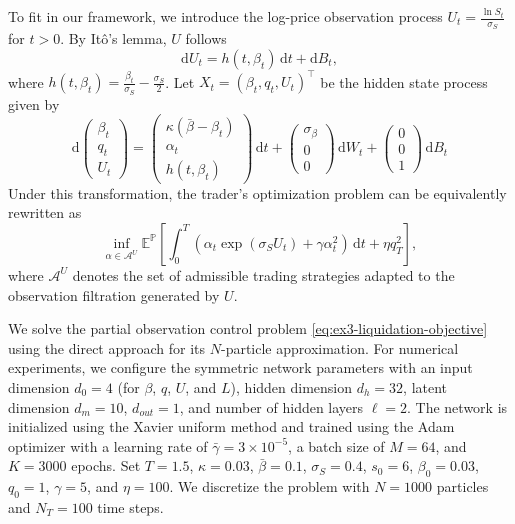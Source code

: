 \documentclass[11pt]{article}
\numberwithin{equation}{section}
\theoremstyle{plain}
\theoremstyle{definition}
\theoremstyle{remark}
\newcommand{\dd}{\mathrm{d}}
\begin{document}
	To fit in our framework, we introduce the log-price observation process $U_t = \frac{\ln S_t}{\sigma_S}$ for $t>0$. By It\^{o}'s lemma, $U$ follows 
	\begin{equation*}
		\dd U_t = h(t, \beta_t)\,\dd t + \dd B_t, 
	\end{equation*}
	where $h(t, \beta_t) = \frac{\beta_t}{\sigma_S} - \frac{\sigma_S}{2}$. 
	Let $X_t = (\beta_t, q_t, U_t)^\top$ be the hidden state process given by 
	\begin{equation*}
		\dd\begin{pmatrix}
			\beta_t \\
			q_t \\
			U_t
		\end{pmatrix} = \begin{pmatrix}
			\kappa(\bar{\beta} - \beta_t) \\
			\alpha_t \\
			h(t,\beta_t)
		\end{pmatrix} \,\dd t + \begin{pmatrix}
			\sigma_\beta \\
			0 \\
			0
		\end{pmatrix}\,\dd W_t + \begin{pmatrix}
			0 \\
			0 \\
			1
		\end{pmatrix} \,\dd B_t
	\end{equation*}
	Under this transformation, the trader's optimization problem can be equivalently rewritten as 
	\begin{equation} \label{eq:ex3-liquidation-objective}
		\inf_{\alpha \in \mathcal{A}^U} \mathbb{E}^{\mathbb{P}}\left[ \int_0^T \left(\alpha_t \exp(\sigma_S U_t) + \gamma \alpha_t^2 \right) \,\dd t + \eta q_T^2 \right], 
	\end{equation}
	where $\mathcal{A}^U$ denotes the set of admissible trading strategies adapted to the observation filtration generated by $U$. 
	
	We solve the partial observation control problem \eqref{eq:ex3-liquidation-objective} using the direct approach for its $N$-particle approximation. For numerical experiments, we configure the symmetric network parameters with an input dimension $d_0=4$ (for $\beta$, $q$, $U$, and $L$), hidden dimension $d_h=32$, latent dimension $d_m=10$, $d_{out}=1$, and number of hidden layers $\ell=2$. The network is initialized using the Xavier uniform method and trained using the Adam optimizer with a learning rate of $\bar{\gamma} = 3\times 10^{-5}$, a batch size of $M=64$, and $K=3000$ epochs. Set $T=1.5$, $\kappa = 0.03$, $\bar{\beta}=0.1$, $\sigma_S = 0.4$, $s_0=6$, $\beta_0=0.03$, $q_0 = 1$, $\gamma = 5$, and $\eta=100$. We discretize the problem with $N=1000$ particles and $N_T=100$ time steps. 
	
\end{document}
